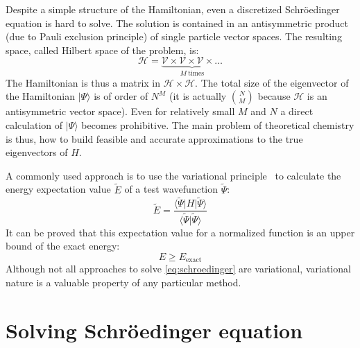 Despite a simple structure of the Hamiltonian, even a discretized
Schr{\"o}edinger equation is hard to solve. The solution is contained in an 
antisymmetric product (due to Pauli exclusion 
principle) of single particle vector spaces. The resulting space, called 
Hilbert space of the problem, is: 
%
\begin{equation}
 \mathcal{H} = \underbrace{\mathcal{V} \times \mathcal{V} \times \mathcal{V} 
\times \ldots}_{M ~\mathrm{times}}
\end{equation}
%
The Hamiltonian is thus a matrix in $\mathcal{H} \times \mathcal{H}$. The total 
size of the eigenvector of the Hamiltonian $|\Psi \rangle$ is 
of order of $N^{M}$ (it is actually $N \choose M$ because $\mathcal{H}$ is an 
antisymmetric vector space). Even for relatively small $M$ and $N$ a direct 
calculation of $|\Psi \rangle$ becomes prohibitive. The main problem of 
theoretical chemistry is thus, how to build feasible and accurate approximations 
to the true eigenvectors of $H$.

A commonly used approach is to use the variational principle~\cite{} to 
calculate the energy expectation value $\tilde{E}$ of a test wavefunction 
$\tilde{\Psi}$:
%
\begin{equation}
 \tilde{E} = \frac{\langle \tilde{\Psi} | H | \tilde{\Psi} \rangle}{\langle 
\tilde{\Psi} |\tilde{\Psi} \rangle} 
\end{equation}
%
It can be proved that this expectation value for a normalized  
function is an upper bound of the exact energy:
%
\begin{equation}
 E \geq E_{\mathrm{exact}}
\end{equation}
Although not all approaches to solve \ref{eq:schroedinger} are variational, 
variational nature is a valuable property of any particular method. 

\section{Solving Schr{\"o}edinger equation}
\label{sec:solving}
